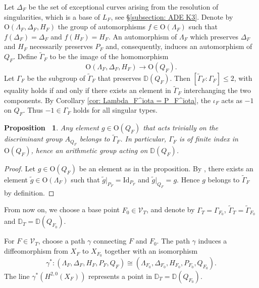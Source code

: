 \documentclass[12pt,reqno,a4paper]{amsart}
\newtheorem{prop}[thm]{Proposition~}
\theoremstyle{remark}
\theoremstyle{definition}
\begin{document}
Let $\Delta_{F}$ be the set of exceptional curves arising from the resolution of singularities, which is a base of $L_F$, see \S \ref{subsection: ADE K3}.
Denote by $\mathrm{O}(\Lambda_F, \Delta_F, H_F)$ the group of automorphisms $f\in \mathrm{O}(\Lambda_F)$ such that $f(\Delta_F)=\Delta_F$ and $f(H_F)=H_F$.
An automorphism of $\Lambda_{F}$ which preserves $\Delta_{F}$ and $H_{F}$ necessarily preserves $P_{F}$ and, consequently, induces an automorphism of $Q_{F}$. 
Define $\widetilde\Gamma_{F}$ to be the image of the homomorphism 
\begin{equation*}
    \mathrm{O}(\Lambda_{F}, \Delta_{F},H_{F})\to \mathrm{O}(Q_{F}).
\end{equation*}
Let $\Gamma_F$ be the subgroup of $\widetilde\Gamma_{F}$ that preserves $\mathbb{D}(Q_F)$.
Then $[\widetilde{\Gamma}_F : \Gamma_F] \leq 2$, with equality holds if and only if there exists an element in $\widetilde{\Gamma}_F$ interchanging the two components.
By Corollary \ref{cor: Lambda_F^iota = P_F^iota}, the $\iota_F$ acts as $-1$ on $Q_F$. Thus $-1\in\Gamma_F$ holds for all singular types. 

\begin{prop}
Any element $g\in\mathrm{O}(Q_{F})$ that acts trivially on the discriminant group $A_{Q_{F}}$ belongs to $\widetilde{\Gamma}_{F}$. In particular, $\Gamma_{F}$ is of finite index in $\mathrm{O}(Q_{F})$, hence an arithmetic group acting on $\mathbb{D}(Q_{F})$.
\end{prop}
\begin{proof}
    Let $g\in\mathrm{O}(Q_{F})$ be an element as in the proposition. By \cite[Corollary 1.5.2]{nikulin1979integer}, there exists an element $\widetilde{g}\in \mathrm{O}(\Lambda_F)$ such that $\widetilde{g}|_{P_F}=\mathrm{Id}_{P_F}$ and $\widetilde{g}|_{Q_F}=g$. Hence $g$ belongs to $\widetilde{\Gamma}_F$ by definition.
\end{proof}



From now on, we choose a base point $F_0\in \mathcal{V}_T$, and denote by $\Gamma_T=\Gamma_{F_0}$, $\widetilde{\Gamma}_T=\widetilde{\Gamma}_{F_0}$ and $\mathbb{D}_T=\mathbb{D}(Q_{F_0})$. 

For $F\in \mathcal{V}_T$, choose a path $\gamma$ connecting $F$ and $F_0$. 
The path $\gamma$ induces a diffeomorphism from $X_F$ to $X_{F_0}$ together with an isomorphism 
\[
\gamma^*\colon (\Lambda_F, \Delta_F, H_F, P_F, Q_F)\cong (\Lambda_{F_0}, \Delta_{F_0}, H_{F_0}, P_{F_0}, Q_{F_0}).
\]
The line $\gamma^*(H^{2,0}(X_F))$ represents a point in $\mathbb{D}_T=\mathbb{D}(Q_{F_0})$.
\end{document}
